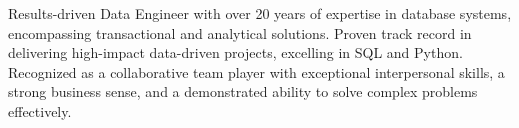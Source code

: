 
\bigskip
\begin{cvparagraph}

Results-driven Data Engineer with over 20 years of expertise in database systems, encompassing transactional and analytical solutions. Proven track record in delivering high-impact data-driven projects, excelling in SQL and Python. Recognized as a collaborative team player with exceptional interpersonal skills, a strong business sense, and a demonstrated ability to solve complex problems effectively.

\end{cvparagraph}